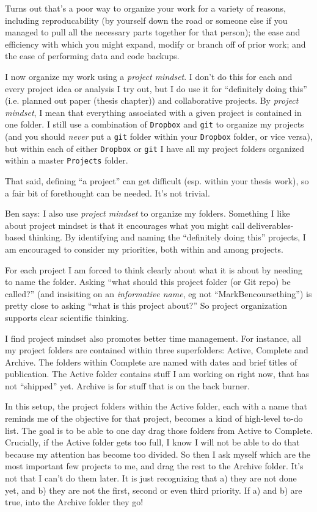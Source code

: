 \documentclass[12pt,letterpaper]{article}
\begin{document}
Turns out that's a poor way to organize your work for a variety of reasons, including reproducability (by yourself down the road or someone else if you managed to pull all the necessary parts together for that person); the ease and efficiency with which you might expand, modify or branch off of prior work; and the ease of performing data and code backups.

I now organize my work using a \emph{project mindset}.  I don't do this for each and every project idea or analysis I try out, but I do use it for ``definitely doing this'' (i.e.  planned out paper (thesis chapter)) and collaborative projects.  By \emph{project mindset}, I mean that everything associated with a given project is contained in one folder.   I still use a combination of \texttt{Dropbox} and \texttt{git} to organize my projects (and you should \emph{never} put a \texttt{git} folder within your \texttt{Dropbox} folder, or vice versa), but within each of either \texttt{Dropbox} or \texttt{git} I have all my project folders organized within a master \texttt{Projects} folder.   

That said, defining ``a project'' can get difficult (esp. within your thesis work), so a fair bit of forethought can be needed.  It's not trivial.

Ben says: I also use \emph{project mindset} to organize my folders.  Something I like about project mindset is that it encourages what you might call deliverables-based thinking. By identifying and naming the ``definitely doing this'' projects, I am encouraged to consider my priorities, both within and among projects. 

For each project I am forced to think clearly about what it is about by needing to name the folder. Asking ``what should this project folder (or Git repo) be called?'' (and insisiting on an \emph{informative name}, eg not ``MarkBencoursething'') is pretty close to asking ``what is this project about?'' So project organization supports clear scientific thinking. 

I find project mindset also promotes better time management. For instance, all my project folders are contained within three superfolders: Active, Complete and Archive. The folders within Complete are named with dates and brief titles of publication. The Active folder contains stuff I am working on right now, that has not ``shipped'' yet. Archive is for stuff that is on the back burner. 

In this setup, the project folders within the Active folder, each with a name that reminds me of the objective for that project, becomes a kind of high-level to-do list. The goal is to be able to one day drag those folders from Active to Complete. Crucially, if the Active folder gets too full, I know I will not be able to do that because my attention has become too divided. So then I ask myself which are the most important few projects to me, and drag the rest to the Archive folder. It's not that I can't do them later. It is just recognizing that a) they are not done yet, and b) they are not the first, second or even third priority. If a) and b) are true, into the Archive folder they go!
\end{document}
